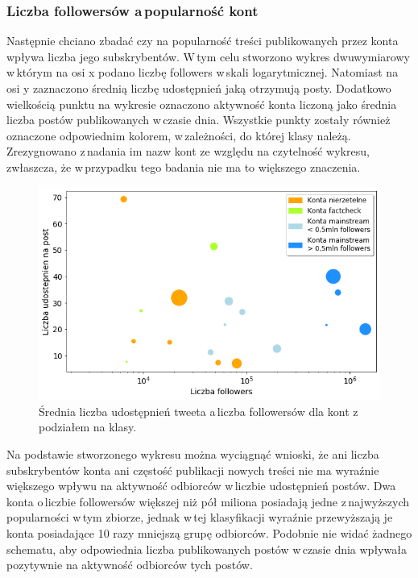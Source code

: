 \subsubsection{Liczba followersów a\,popularność kont}
Następnie chciano zbadać czy na popularność treści publikowanych przez konta wpływa liczba jego subskrybentów. W\,tym celu stworzono wykres dwuwymiarowy w\,którym na osi x podano liczbę followers w\,skali logarytmicznej. Natomiast na osi y zaznaczono średnią liczbę udostępnień jaką otrzymują posty. Dodatkowo wielkością punktu na wykresie oznaczono aktywność konta liczoną jako średnia liczba postów publikowanych w\,czasie dnia. Wszystkie punkty zostały również oznaczone odpowiednim kolorem, w\,zależności, do której klasy należą. Zrezygnowano z\,nadania im nazw kont ze względu na czytelność wykresu, zwłaszcza, że w\,przypadku tego badania nie ma to większego znaczenia. 
\begin{figure}[!h]
	\centering \includegraphics[width=0.95\linewidth]{img/results/retweetsvsfollowers.png}
	\caption{Średnia liczba udostępnień tweeta a\,liczba followersów dla kont z\,podziałem na klasy.} \label{fig:retweets-vs-followers}
\end{figure}
\par

Na podstawie stworzonego wykresu można wyciągnąć wnioski, że ani liczba subskrybentów konta ani częstość publikacji nowych treści nie ma wyraźnie większego wpływu na aktywność odbiorców w\,liczbie udostępnień postów. Dwa konta o\,liczbie followersów większej niż pół miliona posiadają jedne z\,najwyższych popularności w\,tym zbiorze, jednak w\,tej klasyfikacji wyraźnie przewyższają je konta posiadające 10 razy mniejszą grupę odbiorców.  Podobnie nie widać żadnego schematu, aby odpowiednia liczba publikowanych postów w\,czasie dnia wpływała pozytywnie na aktywność odbiorców tych postów. 

